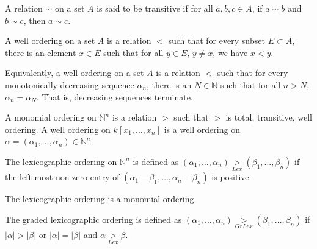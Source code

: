             \begin{definition}
                A relation $\sim$ on a set $A$ is said to be
                transitive if for all $a,b,c\in A$, if $a\sim b$ and
                $b\sim c$, then $a\sim c$.
            \end{definition}
            \begin{definition}
                A well ordering on a set $A$ is a relation $<$
                such that for every subset $E\subset A$, there is an
                element $x\in E$ such that for all $y\in E$, $y\ne x$,
                we have $x<y$.
            \end{definition}
            \begin{remark}
                Equivalently, a well ordering on a set $A$
                is a relation $<$ such that for every monotonically
                decreasing sequence $\alpha_n$, there is an
                $N\in \mathbb{N}$ such that for all $n>N$,
                $\alpha_n = \alpha_N$. That is,
                decreasing sequences terminate.
            \end{remark}
            \begin{definition}
                A monomial ordering on $\mathbb{N}^n$ is a relation
                $>$ such that $>$ is total, transitive, well
                ordering. A well ordering on $k[x_1,\hdots ,x_n]$
                is a well ordering on
                $\alpha=(\alpha_1,\hdots,\alpha_n)\in\mathbb{N}^n$.
            \end{definition}
            \begin{definition}
                The lexicographic ordering on $\mathbb{N}^n$ is
                defined as
                $(\alpha_1,\hdots,\alpha_n)\underset{Lex}{>}%
                 (\beta_1,\hdots,\beta_n)$
                if the left-most non-zero entry of
                $(\alpha_1-\beta_1,\hdots, \alpha_n-\beta_n)$
                is positive.
            \end{definition}
            \begin{theorem}
                The lexicographic ordering is a monomial ordering.
            \end{theorem}
            \begin{definition}
                The graded lexicographic ordering is defined as
                $(\alpha_1,\hdots,\alpha_n)\underset{GrLex}{>}%
                 (\beta_1,\hdots, \beta_n)$
                if $|\alpha|>|\beta|$ or $|\alpha|=|\beta|$
                and $\alpha\underset{Lex}{>}\beta$.
            \end{definition}
